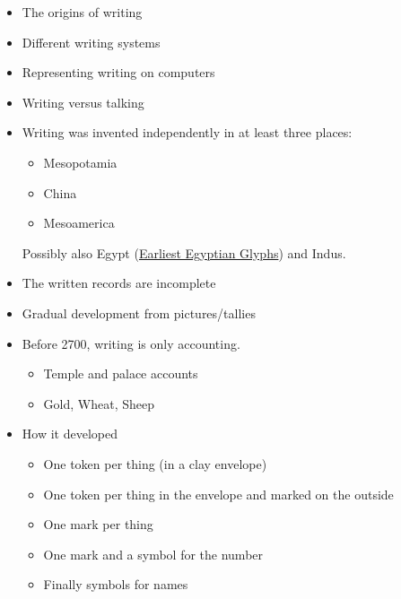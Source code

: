 \documentclass[a4paper,landscape,headrule,footrule,xetex]{foils}
\begin{document}


\maketitle


\begin{itemize}
\item The origins of writing %
\item Different writing systems
\item Representing writing on computers
\item Writing versus talking
\end{itemize}

\begin{itemize}
\item Writing was invented independently in at least three places:
  \begin{itemize}
  \item Mesopotamia
  \item China
  \item Mesoamerica
  \end{itemize}
  Possibly also Egypt
  (\href{https://archive.archaeology.org/9903/newsbriefs/egypt.html}{Earliest
  Egyptian Glyphs}) and Indus.
\item The written records are incomplete
\item Gradual development from pictures/tallies
\end{itemize}


\begin{itemize}
\item Before 2700, writing is only accounting.
  \begin{itemize}
  \item Temple and palace accounts
  \item Gold, Wheat, Sheep
  \end{itemize}
\item How it developed
  \begin{itemize}
  \item One token per thing (in a clay envelope)
  \item One token per thing in the envelope and marked on the outside
  \item One mark per thing
  \item One mark and a symbol for the number
  \item Finally symbols for names
  \end{itemize}
\end{itemize}
\end{document}
